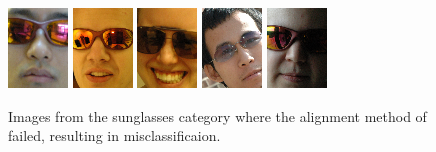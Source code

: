 \begin{figure}
\centering
\newcommand{\imagewidth}{.8in}
\includegraphics[width=\imagewidth]{figures_iccv/sunglass_examples/failed/1.png}
\includegraphics[width=\imagewidth]{figures_iccv/sunglass_examples/failed/2.png}
\includegraphics[width= \imagewidth]{figures_iccv/sunglass_examples/failed/3.png}
\includegraphics[width= \imagewidth]{figures_iccv/sunglass_examples/failed/4.png}
\includegraphics[width= \imagewidth]{figures_iccv/sunglass_examples/failed/5.png}
\caption{Images from the sunglasses category where the alignment method of \cite{Wagner2009-CVPR} failed, resulting in misclassificaion.} \label{fig:registration} \vspace{0mm}
\end{figure}

